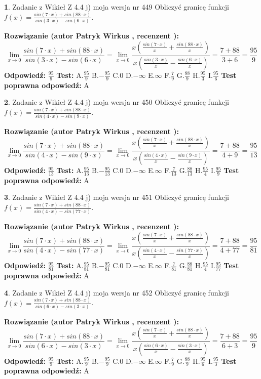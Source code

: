 \documentclass[12pt, a4paper]{article}
\theoremstyle{definition} %
\newtheorem{zad}{}
\newcommand{\zadStart}[1]{\begin{zad}#1\newline}
\newcommand{\zadStop}{\end{zad}}
\newcommand{\rozwStart}[2]{\noindent \textbf{Rozwiązanie (autor #1 , recenzent #2): }\newline}
\newcommand{\rozwStop}{\newline}
\newcommand{\odpStart}{\noindent \textbf{Odpowiedź:}\newline}
\newcommand{\odpStop}{\newline}
\newcommand{\testStart}{\noindent \textbf{Test:}\newline}
\newcommand{\testStop}{\newline}
\newcommand{\kluczStart}{\noindent \textbf{Test poprawna odpowiedź:}\newline}
\newcommand{\kluczStop}{\newline}
\begin{document}
\zadStart{Zadanie z Wikieł Z 4.4 j) moja wersja nr 449}
Obliczyć granicę funkcji $f(x)=\frac{sin(7\cdot x) +sin(88\cdot x)}{sin(3\cdot x) -sin(6\cdot x)}$.
\zadStop
\rozwStart{Patryk Wirkus}{}
$$\lim\limits_{x\to 0}\frac{sin(7\cdot x) +sin(88\cdot x)}{sin(3\cdot x) -sin(6\cdot x)}=\lim\limits_{x\to 0}\frac{x(\frac{sin(7\cdot x)}{x}+\frac{sin(88\cdot x)}{x})}{x(\frac{sin(3\cdot x)}{x}-\frac{sin(6\cdot x)}{x})}=\frac{7+88}{3+6} = \frac{95}{9}$$
\rozwStop
\odpStart
$\frac{95}{9}$
\odpStop
\testStart
A.$\frac{95}{9}$
B.$-\frac{95}{9}$
C.$0$
D.$-\infty$
E.$\infty$
F.$\frac{7}{9}$
G.$\frac{88}{9}$
H.$\frac{95}{3}$
I.$\frac{95}{6}$
\testStop
\kluczStart
A
\kluczStop



\zadStart{Zadanie z Wikieł Z 4.4 j) moja wersja nr 450}
Obliczyć granicę funkcji $f(x)=\frac{sin(7\cdot x) +sin(88\cdot x)}{sin(4\cdot x) -sin(9\cdot x)}$.
\zadStop
\rozwStart{Patryk Wirkus}{}
$$\lim\limits_{x\to 0}\frac{sin(7\cdot x) +sin(88\cdot x)}{sin(4\cdot x) -sin(9\cdot x)}=\lim\limits_{x\to 0}\frac{x(\frac{sin(7\cdot x)}{x}+\frac{sin(88\cdot x)}{x})}{x(\frac{sin(4\cdot x)}{x}-\frac{sin(9\cdot x)}{x})}=\frac{7+88}{4+9} = \frac{95}{13}$$
\rozwStop
\odpStart
$\frac{95}{13}$
\odpStop
\testStart
A.$\frac{95}{13}$
B.$-\frac{95}{13}$
C.$0$
D.$-\infty$
E.$\infty$
F.$\frac{7}{13}$
G.$\frac{88}{13}$
H.$\frac{95}{4}$
I.$\frac{95}{9}$
\testStop
\kluczStart
A
\kluczStop



\zadStart{Zadanie z Wikieł Z 4.4 j) moja wersja nr 451}
Obliczyć granicę funkcji $f(x)=\frac{sin(7\cdot x) +sin(88\cdot x)}{sin(4\cdot x) -sin(77\cdot x)}$.
\zadStop
\rozwStart{Patryk Wirkus}{}
$$\lim\limits_{x\to 0}\frac{sin(7\cdot x) +sin(88\cdot x)}{sin(4\cdot x) -sin(77\cdot x)}=\lim\limits_{x\to 0}\frac{x(\frac{sin(7\cdot x)}{x}+\frac{sin(88\cdot x)}{x})}{x(\frac{sin(4\cdot x)}{x}-\frac{sin(77\cdot x)}{x})}=\frac{7+88}{4+77} = \frac{95}{81}$$
\rozwStop
\odpStart
$\frac{95}{81}$
\odpStop
\testStart
A.$\frac{95}{81}$
B.$-\frac{95}{81}$
C.$0$
D.$-\infty$
E.$\infty$
F.$\frac{7}{81}$
G.$\frac{88}{81}$
H.$\frac{95}{4}$
I.$\frac{95}{77}$
\testStop
\kluczStart
A
\kluczStop



\zadStart{Zadanie z Wikieł Z 4.4 j) moja wersja nr 452}
Obliczyć granicę funkcji $f(x)=\frac{sin(7\cdot x) +sin(88\cdot x)}{sin(6\cdot x) -sin(3\cdot x)}$.
\zadStop
\rozwStart{Patryk Wirkus}{}
$$\lim\limits_{x\to 0}\frac{sin(7\cdot x) +sin(88\cdot x)}{sin(6\cdot x) -sin(3\cdot x)}=\lim\limits_{x\to 0}\frac{x(\frac{sin(7\cdot x)}{x}+\frac{sin(88\cdot x)}{x})}{x(\frac{sin(6\cdot x)}{x}-\frac{sin(3\cdot x)}{x})}=\frac{7+88}{6+3} = \frac{95}{9}$$
\rozwStop
\odpStart
$\frac{95}{9}$
\odpStop
\testStart
A.$\frac{95}{9}$
B.$-\frac{95}{9}$
C.$0$
D.$-\infty$
E.$\infty$
F.$\frac{7}{9}$
G.$\frac{88}{9}$
H.$\frac{95}{6}$
I.$\frac{95}{3}$
\testStop
\kluczStart
A
\kluczStop
\end{document}
